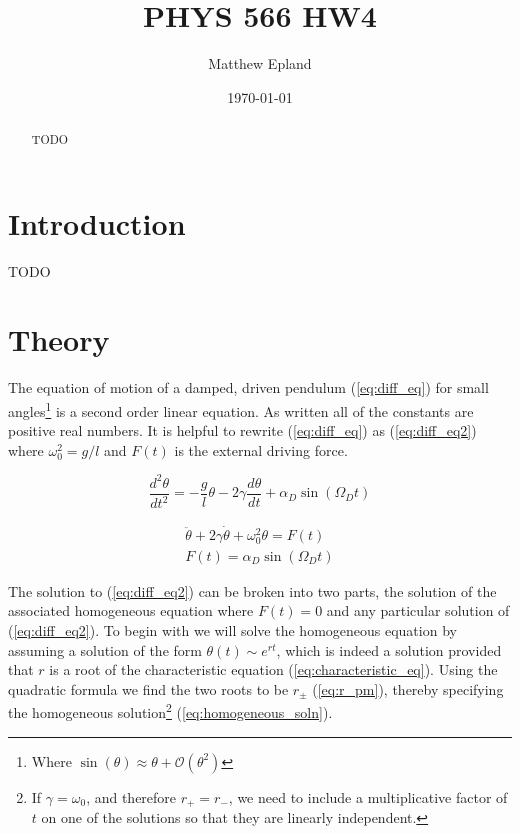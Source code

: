 \documentclass[notitlepage,aps,prd,nofootinbib]{revtex4-1}
\DeclareRobustCommand{\orderof}{\ensuremath{\mathcal{O}}}
\begin{document}
\title{PHYS 566 HW4}
\author{Matthew Epland}

\date{\today}

\begin{abstract}
TODO

\end{abstract}\maketitle


\section{Introduction}
\label{sec:intro}
TODO

\section{Theory}
\label{sec:theory}
The equation of motion of a damped, driven pendulum (\ref{eq:diff_eq}) for small angles\footnote{Where $\sin\left(\theta\right) \approx \theta + \orderof\left(\theta^2\right)$} is a second order linear equation. As written all of the constants are positive real numbers. It is helpful to rewrite (\ref{eq:diff_eq}) as (\ref{eq:diff_eq2}) where $\omega_{0}^2 = g/l$ and $F\left(t\right)$ is the external driving force.

\begin{equation} \label{eq:diff_eq}
\frac{d^2 \theta}{d t^2} = -\frac{g}{l}\theta - 2\gamma\frac{d \theta}{d t} + \alpha_{D}\sin\left(\Omega_{D} t\right)
\end{equation}

\begin{equation} \label{eq:diff_eq2} 
\begin{gathered}
\ddot{\theta} + 2\gamma \dot{\theta} + \omega_{0}^2 \theta = F\left(t\right) \\
F\left(t\right) = \alpha_{D} \sin\left(\Omega_{D} t\right)
\end{gathered}
\end{equation}

The solution to (\ref{eq:diff_eq2}) can be broken into two parts, the solution of the associated homogeneous equation where $F\left(t\right) = 0$ and any particular solution of (\ref{eq:diff_eq2}). To begin with we will solve the homogeneous equation by assuming a solution of the form $\theta\left(t\right) \sim e^{r t}$, which is indeed a solution provided that $r$ is a root of the characteristic equation (\ref{eq:characteristic_eq}). Using the quadratic formula we find the two roots to be $r_{\pm}$ (\ref{eq:r_pm}), thereby specifying the homogeneous solution\footnote{If $\gamma = \omega_{0}$, and therefore $r_{+} = r_{-}$, we need to include a multiplicative factor of $t$ on one of the solutions so that they are linearly independent.} (\ref{eq:homogeneous_soln}). 
\end{document}
